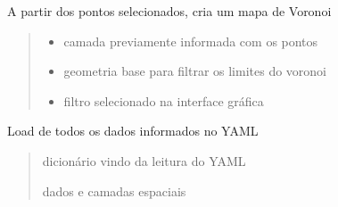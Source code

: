 \documentclass[letterpaper,10pt,brazil]{sphinxmanual}
\begin{document}

\begin{fulllineitems}
\label{\detokenize{pdcvis:app.addMapVoronoi}}
\pysigstartsignatures
{}
\pysigstopsignatures
\sphinxAtStartPar
A partir dos pontos selecionados, cria um mapa de Voronoi
\begin{quote}\begin{description}
\begin{itemize}
\item {} 
\sphinxAtStartPar
{} \textendash{} camada previamente informada com os pontos

\item {} 
\sphinxAtStartPar
{} \textendash{} geometria base para filtrar os limites do voronoi

\item {} 
\sphinxAtStartPar
{} \textendash{} filtro selecionado na interface gráfica

\end{itemize}

\end{description}\end{quote}

\end{fulllineitems}


\begin{fulllineitems}
\label{\detokenize{pdcvis:app.loadData}}
\pysigstartsignatures
{}
\pysigstopsignatures
\sphinxAtStartPar
Load de todos os dados informados no YAML
\begin{quote}\begin{description}
\sphinxAtStartPar
{} \textendash{} dicionário vindo da leitura do YAML

\sphinxAtStartPar
dados e camadas espaciais

\end{description}\end{quote}

\end{fulllineitems}
\end{document}
